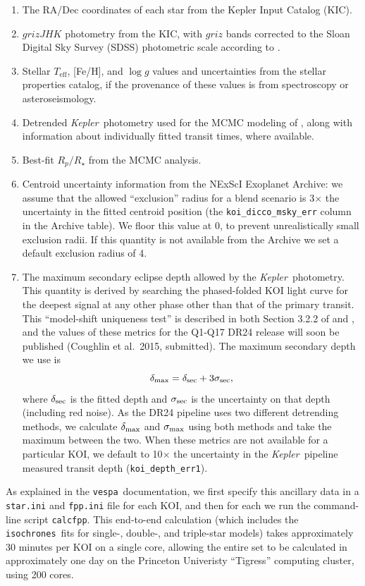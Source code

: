 \documentclass{emulateapj}
\newcommand{\eqlabel}[1]{\label{eq:#1}}
\newcommand{\kepler}{\textit{Kepler}}
\newcommand{\vespa}{\texttt{vespa}}
\newcommand{\isochrones}{\texttt{isochrones}}
\begin{document}
\begin{enumerate}
\item The RA/Dec coordinates of each star from the Kepler Input
  Catalog (KIC).
\item $grizJHK$ photometry from the KIC, with $griz$ bands corrected
  to the Sloan Digital Sky Survey (SDSS) photometric scale according
  to \citet{Pinsonneault:2012}.
\item Stellar $T_\mathrm{eff}$, [Fe/H], and $\log g$ values and
  uncertainties from the \citet{Huber:2014} stellar properties
  catalog, if the provenance of these values is from spectroscopy or
  asteroseismology.
\item Detrended \kepler\ photometry used for the MCMC modeling of
  \citet{Rowe:2015}, along with information about individually fitted
  transit times, where available.  
\item Best-fit $R_p/R_\star$ from the \citet{Rowe:2015} MCMC analysis.
\item Centroid uncertainty information from the NExScI Exoplanet
  Archive: we assume that the allowed ``exclusion'' radius for a blend
  scenario is 3$\times$ the uncertainty in the fitted centroid
  position (the \verb|koi_dicco_msky_err| column in the Archive
  table).  We floor this value at 0, to prevent unrealistically
  small exclusion radii.  If this quantity is not available from the
  Archive we set a default exclusion radius of 4\arcsec.
\item The maximum secondary eclipse depth allowed by the
  \kepler\ photometry.  This quantity is derived by searching the
  phased-folded KOI light curve for the deepest signal at any other
  phase other than that of the primary transit.  This ``model-shift
  uniqueness test'' is described in both Section 3.2.2 of
  \citet{Rowe:2015} and \citet{Coughlin:KSCI}, and the values of these
  metrics for the Q1-Q17 DR24 release will soon be
  published (Coughlin et al.~2015, submitted).  The maximum secondary
  depth we use is
\begin{equation}
\eqlabel{secthresh}
\delta_{\rm max} = \delta_{\rm sec}  + 3 \sigma_{\rm sec},
\end{equation}
where $\delta_{\rm sec}$ is the fitted depth and $\sigma_{\rm sec}$ is
the uncertainty on that depth (including red noise).  As the DR24
pipeline uses two different detrending methods, we calculate
$\delta_{\rm max}$ and $\sigma_{\rm max}$ using both methods and take
the maximum between the two.  When these metrics are not available for
a particular KOI, we default to 10$\times$ the uncertainty in the
\kepler\ pipeline measured transit depth (\verb|koi_depth_err1|).
  
\end{enumerate}
As explained in the \vespa\ documentation, we first specify this
ancillary data in a \verb|star.ini| and \verb|fpp.ini| file for each
KOI, and then for each we run the command-line script \verb|calcfpp|.
This end-to-end calculation (which includes the \isochrones\ fits for
single-, double-, and triple-star models) takes approximately 30
minutes per KOI on a single core, allowing the entire set to be
calculated in approximately one day on the Princeton Univeristy
``Tigress'' computing cluster, using 200 cores.
\end{document}
